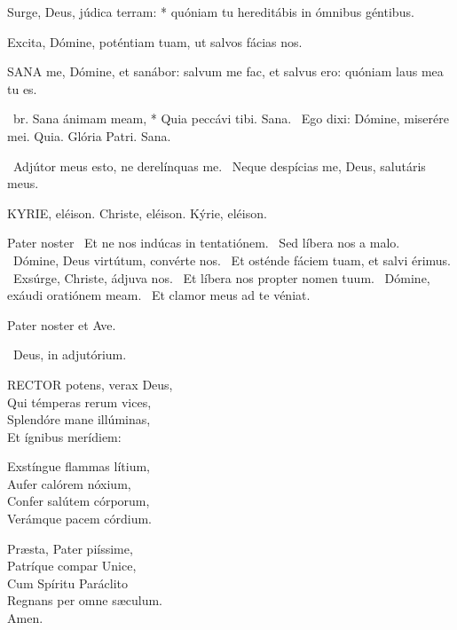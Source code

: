 Surge, Deus, júdica terram: * quóniam tu hereditábis in ómnibus géntibus.

 Excita, Dómine, poténtiam tuam, ut salvos fácias nos.



\lettrine[lines=2]{S}{ANA} me, Dómine, et sanábor: salvum me fac, et salvus ero: quóniam laus mea tu es.

\R\ br. Sana ánimam meam, * Quia peccávi tibi. Sana. \V\ Ego dixi: Dómine, miserére mei. Quia. Glória Patri. Sana.

\V\ Adjútor meus esto, ne derelínquas me. \R\ Neque despícias me, Deus, salutáris meus.



KYRIE, eléison. Christe, eléison. Kýrie, eléison.

Pater noster  \V\ Et ne nos indúcas in tentatiónem. \R\ Sed líbera nos a malo. \V\ Dómine, Deus virtútum, convérte nos. \R\ Et osténde fáciem tuam, et salvi érimus. \V\ Exsúrge, Christe, ádjuva nos. \R\ Et líbera nos propter nomen tuum. \V\ Dómine, exáudi oratiónem meam. \R\ Et clamor meus ad te véniat.



Pater noster et Ave.

\V\ Deus, in adjutórium.


\lettrine[lines=2]{R}{ECTOR} potens, verax Deus,\\
Qui témperas rerum vices,\\
Splendóre mane illúminas,\\
Et ígnibus merídiem:

Exstíngue flammas lítium,\\
Aufer calórem nóxium,\\
Confer salútem córporum,\\
Verámque pacem córdium.

Præsta, Pater piíssime,\\
Patríque compar Unice,\\
Cum Spíritu Paráclito\\
Regnans per omne sæculum.\\
Amen.

